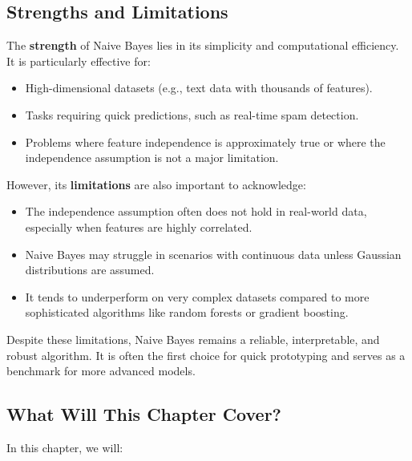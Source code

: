 \documentclass[
]{book}
\providecommand{\tightlist}{%
  \setlength{\itemsep}{0pt}\setlength{\parskip}{0pt}}
\theoremstyle{definition}
\theoremstyle{definition}
\theoremstyle{definition}
\theoremstyle{definition}
\theoremstyle{remark}
\begin{document}
\subsection*{Strengths and Limitations}\label{strengths-and-limitations}

The \textbf{strength} of Naive Bayes lies in its simplicity and computational efficiency. It is particularly effective for:

\begin{itemize}
\tightlist
\item
  High-dimensional datasets (e.g., text data with thousands of features).
\item
  Tasks requiring quick predictions, such as real-time spam detection.
\item
  Problems where feature independence is approximately true or where the independence assumption is not a major limitation.
\end{itemize}

However, its \textbf{limitations} are also important to acknowledge:

\begin{itemize}
\tightlist
\item
  The independence assumption often does not hold in real-world data, especially when features are highly correlated.
\item
  Naive Bayes may struggle in scenarios with continuous data unless Gaussian distributions are assumed.
\item
  It tends to underperform on very complex datasets compared to more sophisticated algorithms like random forests or gradient boosting.
\end{itemize}

Despite these limitations, Naive Bayes remains a reliable, interpretable, and robust algorithm. It is often the first choice for quick prototyping and serves as a benchmark for more advanced models.

\subsection*{What Will This Chapter Cover?}\label{what-will-this-chapter-cover}

In this chapter, we will:
\end{document}

